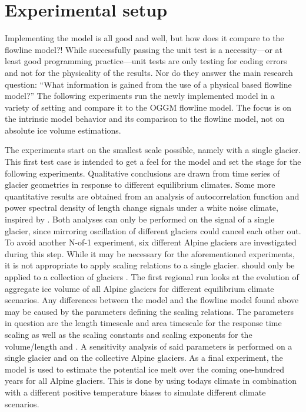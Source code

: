 


\section{Experimental setup} %
\label{sec:experimental_setup}
    
    Implementing the \vas{} model is all good and well, but how does it compare to the flowline model?!
    While successfully passing the unit test is a necessity---or at least good programming practice---unit tests are only testing for coding errors and not for the physicality of the results. Nor do they answer the main research question: ``What information is gained from the use of a physical based flowline model?'' The following experiments run the newly implemented model in a variety of setting and compare it to the OGGM flowline model. The focus is on the intrinsic model behavior and its comparison to the flowline model, not on absolute ice volume estimations.

    The experiments start on the smallest scale possible, namely with a single glacier. This first test case is intended to get a feel for the model and set the stage for the following experiments. Qualitative conclusions are drawn from time series of glacier geometries in response to different equilibrium climates. Some more quantitative results are obtained from an analysis of autocorrelation function and power spectral density of length change signals under a white noise climate, inspired by \citep{Roe2014}. Both analyses can only be performed on the signal of a single glacier, since mirroring oscillation of different glaciers could cancel each other out. To avoid another N-of-1 experiment, six different Alpine glaciers are investigated during this step. 
    While it may be necessary for the aforementioned experiments, it is not appropriate to apply scaling relations to a single glacier. \Vas{} should only be applied to a collection of glaciers \citep{Bahr2015}. The first regional run looks at the evolution of aggregate ice volume of all Alpine glaciers for different equilibrium climate scenarios.
    Any differences between the \vas{} model and the flowline model found above may be caused by the parameters defining the scaling relations. The parameters in question are the length timescale and area timescale for the response time scaling as well as the scaling constants and scaling exponents for the volume/length and \vas{}. A sensitivity analysis of said parameters is performed on a single glacier and on the collective Alpine glaciers.
    As a final experiment, the \vas{} model is used to estimate the potential ice melt over the coming one-hundred years for all Alpine glaciers. This is done by using todays climate in combination with a different positive temperature biases to simulate different climate scenarios.

